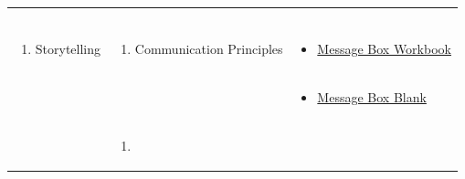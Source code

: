 \documentclass[
]{book}
\providecommand{\tightlist}{%
  \setlength{\itemsep}{0pt}\setlength{\parskip}{0pt}}
\begin{document}
\begin{longtable}[]{@{}lll@{}}
\begin{minipage}[t]{0.34\columnwidth}
\begin{enumerate}
\end{enumerate}\strut
\end{minipage} & \begin{minipage}[t]{0.42\columnwidth}\raggedright
\strut
\end{minipage}\tabularnewline
\begin{minipage}[t]{0.15\columnwidth}\raggedright
\begin{enumerate}
\def\labelenumi{\arabic{enumi}.}
\setcounter{enumi}{3}
\tightlist
\item
  Storytelling
\end{enumerate}\strut
\end{minipage} & \begin{minipage}[t]{0.34\columnwidth}\raggedright
\begin{enumerate}
\def\labelenumi{\arabic{enumi}.}
\tightlist
\item
  Communication Principles
\end{enumerate}\strut
\end{minipage} & \begin{minipage}[t]{0.42\columnwidth}\raggedright
\begin{itemize}
\tightlist
\item
  \href{https://www.compassscicomm.org/wp-content/uploads/2020/05/The-Message-Box-Workbook.pdf}{Message Box Workbook}
\end{itemize}\strut
\end{minipage}\tabularnewline
\begin{minipage}[t]{0.15\columnwidth}\raggedright
\strut
\end{minipage} & \begin{minipage}[t]{0.34\columnwidth}\raggedright
\strut
\end{minipage} & \begin{minipage}[t]{0.42\columnwidth}\raggedright
\begin{itemize}
\tightlist
\item
  \href{files/Message-Box-Blank.pdf}{Message Box Blank}
\end{itemize}\strut
\end{minipage}\tabularnewline
\begin{minipage}[t]{0.15\columnwidth}\raggedright
\strut
\end{minipage} & \begin{minipage}[t]{0.34\columnwidth}\raggedright
\begin{enumerate}
\def\labelenumi{\arabic{enumi}.}
\setcounter{enumi}{1}
\tightlist
\item

\end{enumerate}
\end{minipage}
\end{longtable}
\end{document}
